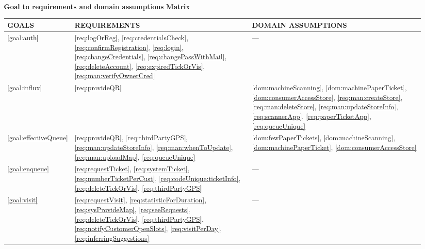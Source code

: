 \documentclass[a4paper, 10pt, oneside]{article}
\begin{document}
\label{uc:gToReDMatrix}
\begin{center}
{\textbf{Goal to requirements and domain assumptions Matrix}}
\end{center}

\begin{tabularx}{\linewidth}{| p{20mm} | p{50mm} | p{50mm} |}

     \hline
	GOALS & REQUIREMENTS & DOMAIN ASSUMPTIONS \\
	\hline 
	\ref{goal:auth} & \ref{req:logOrReg}, \ref{req:credentialsCheck}, \ref{req:confirmRegistration}, \ref{req:login}, \ref{req:changeCredentials}, \ref{req:changePassWithMail}, \ref{req:deleteAccount}, \ref{req:expiredTickOrVis}, \ref{req:man:verifyOwnerCred} & --- \\
	
	\hline
	\ref{goal:influx} & \ref{req:provideQR} & \ref{dom:machineScanning}, \ref{dom:machinePaperTicket}, \ref{dom:consumerAccessStore}, \ref{req:man:createStore}, \ref{req:man:deleteStore}, \ref{req:man:updateStoreInfo}, \ref{req:scannerApp}, \ref{req:paperTicketApp}, \ref{req:queueUnique} \\
	
	 \hline 
	\ref{goal:effectiveQueue} & \ref{req:provideQR}, \ref{req:thirdPartyGPS}, \ref{req:man:updateStoreInfo}, \ref{req:man:whenToUpdate}, \ref{req:man:uploadMap}, \ref{req:queueUnique} & \ref{dom:fewPaperTickets}, \ref{dom:machineScanning}, \ref{dom:machinePaperTicket}, \ref{dom:consumerAccessStore} \\
	
	\hline
	\ref{goal:enqueue} & \ref{req:requestTicket}, \ref{req:systemTicket}, \ref{req:numberTicketPerCust}, \ref{req:codeUnique:ticketInfo}, \ref{req:deleteTickOrVis}, \ref{req:thirdPartyGPS} & ---  \\

	\hline
	
	\ref{goal:visit} & \ref{req:requestVisit}, \ref{req:statisticForDuration}, \ref{req:sysProvideMap}, \ref{req:seeRequests}, \ref{req:deleteTickOrVis}, \ref{req:thirdPartyGPS}, \ref{req:notifyCustomerOpenSlots}, \ref{req:visitPerDay}, \ref{req:inferringSuggestions}  & ---  \\

	\hline
	
\end{tabularx}
\end{document}

